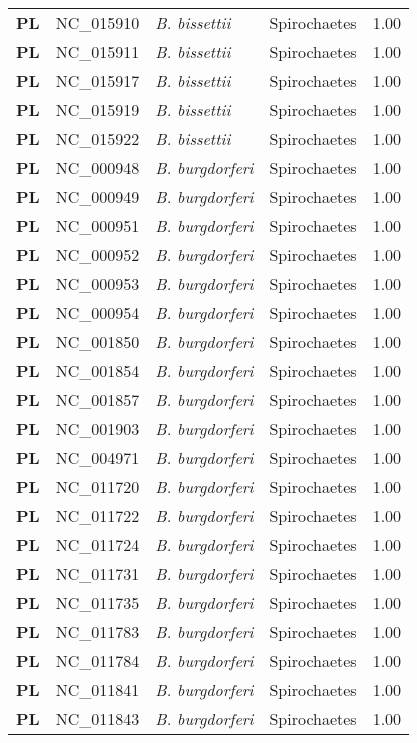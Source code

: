 \begin{adjustwidth}{-3cm}{2cm}
{\begin{supertabular}{>{\bfseries}l|p{0.1\textwidth}p{0.14\textwidth}l|l}
PL & NC\_015910 & \textit{B. bissettii} & Spirochaetes & 1.00\\
PL & NC\_015911 & \textit{B. bissettii} & Spirochaetes & 1.00\\
PL & NC\_015917 & \textit{B. bissettii} & Spirochaetes & 1.00\\
PL & NC\_015919 & \textit{B. bissettii} & Spirochaetes & 1.00\\
PL & NC\_015922 & \textit{B. bissettii} & Spirochaetes & 1.00\\
PL & NC\_000948 & \textit{B. burgdorferi} & Spirochaetes & 1.00\\
PL & NC\_000949 & \textit{B. burgdorferi} & Spirochaetes & 1.00\\
PL & NC\_000951 & \textit{B. burgdorferi} & Spirochaetes & 1.00\\
PL & NC\_000952 & \textit{B. burgdorferi} & Spirochaetes & 1.00\\
PL & NC\_000953 & \textit{B. burgdorferi} & Spirochaetes & 1.00\\
PL & NC\_000954 & \textit{B. burgdorferi} & Spirochaetes & 1.00\\
PL & NC\_001850 & \textit{B. burgdorferi} & Spirochaetes & 1.00\\
PL & NC\_001854 & \textit{B. burgdorferi} & Spirochaetes & 1.00\\
PL & NC\_001857 & \textit{B. burgdorferi} & Spirochaetes & 1.00\\
PL & NC\_001903 & \textit{B. burgdorferi} & Spirochaetes & 1.00\\
PL & NC\_004971 & \textit{B. burgdorferi} & Spirochaetes & 1.00\\
PL & NC\_011720 & \textit{B. burgdorferi} & Spirochaetes & 1.00\\
PL & NC\_011722 & \textit{B. burgdorferi} & Spirochaetes & 1.00\\
PL & NC\_011724 & \textit{B. burgdorferi} & Spirochaetes & 1.00\\
PL & NC\_011731 & \textit{B. burgdorferi} & Spirochaetes & 1.00\\
PL & NC\_011735 & \textit{B. burgdorferi} & Spirochaetes & 1.00\\
PL & NC\_011783 & \textit{B. burgdorferi} & Spirochaetes & 1.00\\
PL & NC\_011784 & \textit{B. burgdorferi} & Spirochaetes & 1.00\\
PL & NC\_011841 & \textit{B. burgdorferi} & Spirochaetes & 1.00\\
PL & NC\_011843 & \textit{B. burgdorferi} & Spirochaetes & 1.00\\

\end{supertabular}}
\end{adjustwidth}
